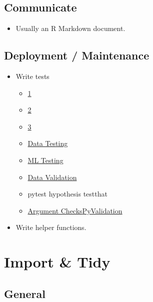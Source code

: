 \documentclass[]{book}
\providecommand{\tightlist}{%
  \setlength{\itemsep}{0pt}\setlength{\parskip}{0pt}}
\theoremstyle{definition}
\theoremstyle{definition}
\theoremstyle{definition}
\theoremstyle{remark}
\begin{document}
\section{Communicate}\label{communicate}

\begin{itemize}
\tightlist
\item
  Usually an R Markdown document.
\end{itemize}

\section{Deployment / Maintenance}\label{deployment-maintenance}

\begin{itemize}
\tightlist
\item
  Write tests

  \begin{itemize}
  \tightlist
  \item
    \href{http://engineering.pivotal.io/post/test-driven-development-for-data-science/}{1}
  \item
    \href{http://www.tdda.info/}{2}
  \item
    \href{http://stochasticsolutions.com/}{3}
  \item
    \href{https://github.com/ericmjl/data-testing-tutorial}{Data
    Testing}
  \item
    \href{https://medium.com/@keeper6928/how-to-unit-test-machine-learning-code-57cf6fd81765}{ML
    Testing}
  \item
    \href{https://github.com/data-cleaning/validate}{Data Validation}
  \item
    pytest \textbar{} hypothesis \textbar{} testthat
  \item
    \href{https://rdrr.io/cran/checkmate/}{Argument
    Checks}\href{https://github.com/shawnbrown/datatest}{PyValidation}
  \end{itemize}
\item
  Write helper functions.
\end{itemize}

\chapter{Import \& Tidy}\label{import-tidy}

\section{General}\label{general}
\end{document}
